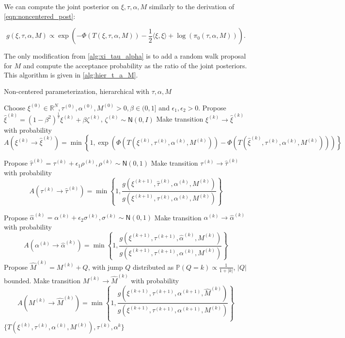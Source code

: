 \documentclass{siamart1116}
\begin{document}
        We can compute the joint posterior on $\xi, \tau, \alpha, M$ similarly to the derivation of \cref{eqn:noncentered_post}:

        \begin{equation}
        \label{eqn:noncentered_post_M}
        g(\xi,\tau,\alpha, M) \propto \exp\left( -\Phi(T(\xi,\tau,\alpha,M))-\frac{1}{2}\langle \xi,\xi \rangle + \log(\pi_0(\tau,\alpha,M)) \right).
        \end{equation}

        The only modification from \cref{alg:xi_tau_alpha} is to add a random walk proposal for $M$ and compute the acceptance probability as the ratio of the joint posteriors. This algorithm is given in \cref{alg:hier_t_a_M}.

        \begin{algorithm}

        \caption{Non-centered parameterization, hierarchical with $\tau, \alpha, M$}
        \label{alg:hier_t_a_M}
        \begin{algorithmic}[1]
        \State Choose $\xi^{(0)} \in \mathbb{R}^N, \tau^{(0)}, \alpha^{(0)}, M^{(0)} > 0, \beta \in (0, 1]$ and $\epsilon_1, \epsilon_2 > 0$.
        \State Propose $\hat\xi^{(k)} = (1-\beta^2)^{\frac{1}{2}}\xi^{(k)} + \beta \zeta^{(k)}$, $\zeta^{(k)} \sim \mathsf{N}(0, I)$
        \State Make transition $\xi^{(k)} \to \hat\xi^{(k)}$ with probability
        \[ A(\xi^{(k)} \to \hat\xi^{(k)}) = \min\left\{1, \exp\left(\Phi(T(\xi^{(k)},\tau^{(k)},\alpha^{(k)}, M^{(k)})) - \Phi(T(\hat\xi^{(k)},\tau^{(k)},\alpha^{(k)}, M^{(k)}))\right) \right\}\] 

        \State Propose $\hat\tau^{(k)} = \tau^{(k)} + \epsilon_1 \rho^{(k)}, \rho^{(k)} \sim \mathsf{N}(0,1)$
        \State Make transition $\tau^{(k)} \to \hat\tau^{(k)}$ with probability
        \[ A(\tau^{(k)} \to \hat\tau^{(k)}) 
        = \min\left\{1, \frac{g(\xi^{(k+1)},\hat\tau^{(k)},\alpha^{(k)},M^{(k)})}{g(\xi^{(k+1)},\tau^{(k)},\alpha^{(k)},M^{(k)})} \right\}\] 

        \State Propose $\hat\alpha^{(k)} = \alpha^{(k)} + \epsilon_2 \sigma^{(k)}, \sigma^{(k)} \sim \mathsf{N}(0,1)$
        \State Make transition $\alpha^{(k)} \to \hat\alpha^{(k)}$ with probability
        \[ A(\alpha^{(k)} \to \hat\alpha^{(k)}) 
        = \min\left\{1, \frac{g(\xi^{(k+1)},\tau^{(k+1)},\hat \alpha^{(k)},M^{(k)})}{g(\xi^{(k+1)},\tau^{(k+1)},\alpha^{(k)},M^{(k)})} \right\}\]
        \State Propose $\hat M^{(k)} = M^{(k)} + Q$, with jump $Q$ distributed as $\mathbb{P}(Q=k) \propto \frac{1}{1+|k|}$, $|Q|$ bounded.
        \State Make transition $M^{(k)} \to \hat M^{(k)}$ with probability
        \[ A(M^{(k)} \to \hat M^{(k)}) = 
        \min\left\{1, \frac{g(\xi^{(k+1)},\tau^{(k+1)},\alpha^{(k+1)},\hat M^{(k)})}{g(\xi^{(k+1)},\tau^{(k+1)},\alpha^{(k+1)},M^{(k)})} \right\}
        \]
        \EndFor
        \State \Return $\{ T(\xi^{(k)},\tau^{(k)},\alpha^{(k)}, M^{(k)}), \tau^{(k)}, \alpha^{k} \}$
        \end{algorithmic}
        \end{algorithm}
\end{document}
